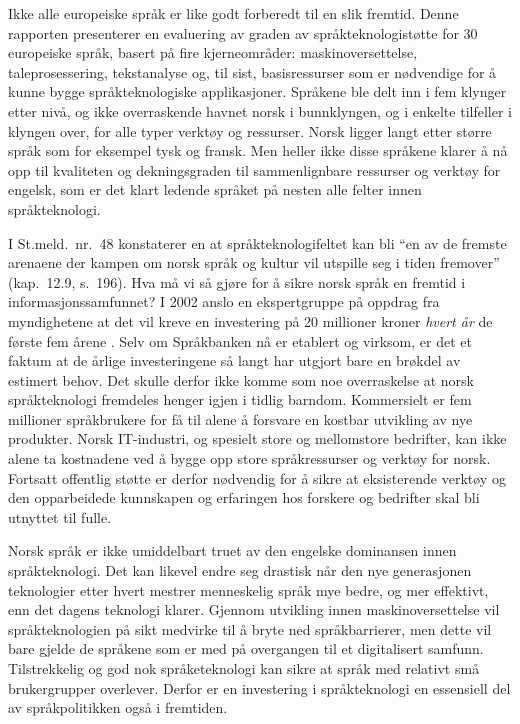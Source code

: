 \begin{multicols}{2}
Ikke alle europeiske språk er like godt forberedt til en slik fremtid. Denne rapporten presenterer en evaluering av graden av språkteknologistøtte for 30 europeiske språk, basert på fire kjerneområder: maskinoversettelse, taleprosessering, tekstanalyse og, til sist, basisressurser som er nødvendige for å kunne bygge språkteknologiske applikasjoner. Språkene ble delt inn i fem klynger etter nivå, og ikke overraskende havnet norsk i bunnklyngen, og i enkelte tilfeller i klyngen over, for alle typer verktøy og ressurser. Norsk ligger langt etter større språk som for eksempel tysk og fransk. Men heller ikke disse språkene klarer å nå opp til kvaliteten og dekningsgraden til sammenlignbare ressurser og verktøy for engelsk, som er det klart ledende språket på nesten alle felter innen språkteknologi.

I St.meld.~nr.~48 \cite{stm48:2002} konstaterer en at språkteknologifeltet kan bli ``en av de fremste arenaene der kampen om norsk språk og kultur vil utspille seg i tiden fremover'' (kap.~12.9, s.~196). Hva må vi så gjøre for å sikre norsk språk en fremtid i informasjonssamfunnet? I 2002 anslo en ekspertgruppe på oppdrag fra myndighetene  at det vil kreve en investering på 20 millioner kroner \emph{hvert år} de første fem årene \cite{SR:2002:eng}. Selv om Språkbanken nå er etablert og virksom, er det et faktum at de årlige investeringene så langt har utgjort bare en brøkdel av estimert behov. Det skulle derfor ikke komme som noe overraskelse at norsk språkteknologi fremdeles henger igjen i tidlig barndom. Kommersielt er fem millioner språkbrukere for få til alene å forsvare en kostbar utvikling av nye produkter. Norsk IT-industri, og spesielt store og mellomstore bedrifter, kan ikke alene ta kostnadene ved å bygge opp store språkressurser og verktøy for norsk. Fortsatt offentlig støtte er derfor nødvendig for å sikre at eksisterende verktøy og den opparbeidede kunnskapen og erfaringen hos forskere og bedrifter skal bli utnyttet til fulle. 

Norsk språk er ikke umiddelbart truet av den engelske dominansen innen
språkteknologi. Det kan likevel endre seg drastisk når den nye
generasjonen teknologier etter hvert mestrer menneskelig språk mye
bedre, og mer effektivt, enn det dagens teknologi klarer. Gjennom
utvikling innen maskinoversettelse vil språkteknologien på sikt
medvirke til å bryte ned språkbarrierer, men dette vil bare gjelde de
språkene som er med på overgangen til et digitalisert
samfunn. Tilstrekkelig og god nok språketeknologi kan sikre at språk
med relativt små brukergrupper overlever. Derfor er en investering i
språkteknologi en essensiell del av språkpolitikken også i fremtiden.


\end{multicols}
